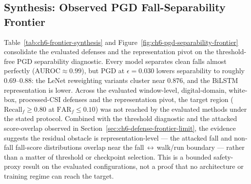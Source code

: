\subsection{Synthesis: Observed PGD Fall-Separability Frontier}
\label{subsec:ch6-frontier-synthesis}

Table~\ref{tab:ch6-frontier-synthesis} and Figure~\ref{fig:ch6-pgd-separability-frontier} consolidate the
evaluated defenses and the representation pivot on the threshold-free PGD separability diagnostic. Every
model separates clean falls almost perfectly (\(\mathrm{AUROC}\approx 0.99\)), but PGD at
\(\epsilon=0.030\) lowers separability to roughly \(0.69\)--\(0.88\): the LeNet reweighting variants cluster
near \(0.876\), and the BiLSTM representation is lower. Across the evaluated window-level, digital-domain,
white-box, processed-CSI defenses and the representation pivot, the target region
(\(\mathrm{Recall}_f\geq 0.80\) at \(\mathrm{FAR}_f\leq 0.10\)) was not reached by the evaluated methods
under the stated protocol. Combined with the threshold diagnostic and the attacked score-overlap observed
in Section~\ref{sec:ch6-defense-frontier-limit}, the evidence suggests the residual obstacle is
representation-level --- the attacked fall and non-fall fall-score distributions overlap near the
fall\,\(\leftrightarrow\)\,walk/run boundary --- rather than a matter of threshold or checkpoint selection.
This is a bounded safety-proxy result on the evaluated configurations, not a proof that no architecture or
training regime can reach the target.

